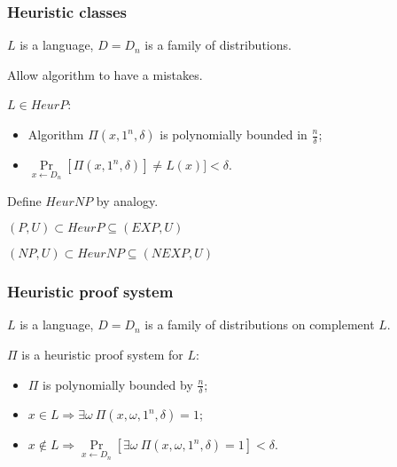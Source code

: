 \begin{frame}
    \frametitle{Heuristic classes}

    $L$ is a language, $D = {D_n}$ is a family of distributions.

    Allow algorithm to have a mistakes.

    \pause
    \begin{definition}
        $L \in HeurP$:
        \begin{itemize}
            \item Algorithm $\Pi(x, 1^n, \delta)$ is polynomially bounded in $\frac{n}{\delta}$;
            \item $\Pr\limits_{x \gets D_n}[\Pi(x, 1^n, \delta)] \neq
        		L(x)] < \delta$.
        \end{itemize}
    \end{definition}

    Define $HeurNP$ by analogy.

    \pause

    \vspace{0.5cm}
    $(P, U) \subset HeurP \subseteq (EXP, U)$
    
    $(NP, U) \subset HeurNP \subseteq (NEXP, U)$
\end{frame}

\begin{frame}
    \frametitle{Heuristic proof system}

    $L$ is a language, $D = {D_n}$ is a family of distributions on
    complement $L$.

    \pause
    \begin{definition}
        $\Pi$ is a heuristic proof system for $L$:
        \begin{itemize}
            \item $\Pi$ is polynomially bounded by $\frac{n}{\delta}$;
            \item $x \in L \Rightarrow \exists \omega~\Pi(x, \omega,
        		1^n, \delta) = 1$;
            \item $x \notin L \Rightarrow
        		\Pr\limits_{x \gets D_n}[\exists \omega~
                \Pi(x, \omega, 1^n, \delta) = 1] < \delta$.
        \end{itemize}
    \end{definition}
    
\end{frame}

